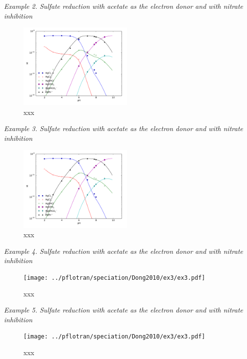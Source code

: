 \documentclass[12pt, a4paper]{article}
\begin{document}
\emph{Example 2. Sulfate reduction with acetate as the electron donor and with nitrate inhibition}
\\
\begin{figure}[h]
\centering
\includegraphics[width=0.5\textwidth]{../pflotran/speciation/Dong2010/ex2/ex2.pdf}
\caption{xxx}
\label{Fig2}
\end{figure}

\emph{Example 3. Sulfate reduction with acetate as the electron donor and with nitrate inhibition}
\\
\begin{figure}[h]
\centering
\includegraphics[width=0.5\textwidth]{../pflotran/speciation/Dong2010/ex2a/ex2.pdf}
\caption{xxx}
\label{Fig2a}
\end{figure}

\emph{Example 4. Sulfate reduction with acetate as the electron donor and with nitrate inhibition}
\\
\begin{figure}[h]
\centering
\texttt{[image: ../pflotran/speciation/Dong2010/ex3/ex3.pdf]}
\caption{xxx}
\label{Fig3}
\end{figure}

\emph{Example 5. Sulfate reduction with acetate as the electron donor and with nitrate inhibition}
\\
\begin{figure}[h]
\centering
\texttt{[image: ../pflotran/speciation/Dong2010/ex3/ex3.pdf]}
\caption{xxx}
\label{Fig3}
\end{figure}
\end{document}
